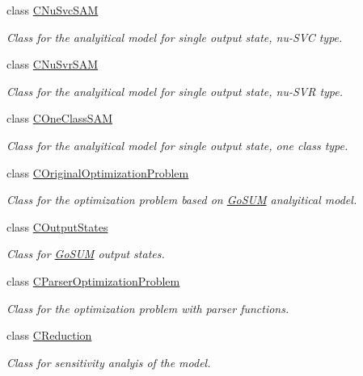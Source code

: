 \begin{DoxyCompactItemize}
class \hyperlink{class_go_s_u_m_1_1_c_nu_svc_s_a_m}{C\-Nu\-Svc\-S\-A\-M}
\begin{DoxyCompactList}\small\item\em Class for the analyitical model for single output state, nu-\/\-S\-V\-C type. \end{DoxyCompactList}\item 
class \hyperlink{class_go_s_u_m_1_1_c_nu_svr_s_a_m}{C\-Nu\-Svr\-S\-A\-M}
\begin{DoxyCompactList}\small\item\em Class for the analyitical model for single output state, nu-\/\-S\-V\-R type. \end{DoxyCompactList}\item 
class \hyperlink{class_go_s_u_m_1_1_c_one_class_s_a_m}{C\-One\-Class\-S\-A\-M}
\begin{DoxyCompactList}\small\item\em Class for the analyitical model for single output state, one class type. \end{DoxyCompactList}\item 
class \hyperlink{class_go_s_u_m_1_1_c_original_optimization_problem}{C\-Original\-Optimization\-Problem}
\begin{DoxyCompactList}\small\item\em Class for the optimization problem based on \hyperlink{struct_go_s_u_m}{Go\-S\-U\-M} analyitical model. \end{DoxyCompactList}\item 
class \hyperlink{class_go_s_u_m_1_1_c_output_states}{C\-Output\-States}
\begin{DoxyCompactList}\small\item\em Class for \hyperlink{struct_go_s_u_m}{Go\-S\-U\-M} output states. \end{DoxyCompactList}\item 
class \hyperlink{class_go_s_u_m_1_1_c_parser_optimization_problem}{C\-Parser\-Optimization\-Problem}
\begin{DoxyCompactList}\small\item\em Class for the optimization problem with parser functions. \end{DoxyCompactList}\item 
class \hyperlink{class_go_s_u_m_1_1_c_reduction}{C\-Reduction}
\begin{DoxyCompactList}\small\item\em Class for sensitivity analyis of the model. \end{DoxyCompactList}\item 

\end{DoxyCompactItemize}
